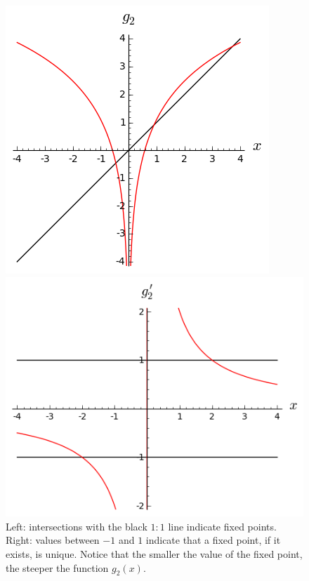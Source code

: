 \documentclass[11pt]{article}
\begin{document}
\begin{figure}[h!]
\begin{minipage}{0.48\textwidth}
\includegraphics[width=\textwidth]{g2.png}
\end{minipage}
\begin{minipage}{0.48\textwidth}
\includegraphics[width=\textwidth]{g2p.png}
\end{minipage}
\caption{Left: intersections with the black \(1:1\) line indicate fixed points. Right: values between \(-1\) and \(1\) indicate that a fixed point, if it exists, is unique. Notice that the smaller the value of the fixed point, the steeper the function \(g_2(x)\).}\label{fig::g2}
\end{figure}
\end{document}
